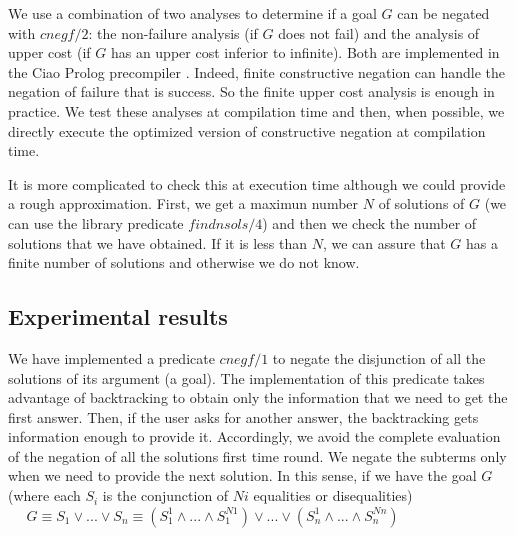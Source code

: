 \documentclass{tlp}
\begin{document}
We use a combination of two analyses to determine if a goal $G$ can be negated with $cnegf/2$: the non-failure analysis
 (if $G$ does not fail) %
and the analysis of upper cost \cite{Lopez2} (if $G$ has an upper cost inferior to infinite). Both are
implemented in the Ciao Prolog precompiler
\cite{ciaopp-iclp99-tut}. Indeed, finite constructive negation can handle the
negation of failure that is success. So the finite upper cost analysis
is enough in practice. We test these analyses at compilation time
and then, when possible, we directly execute the optimized version
of constructive negation at compilation time.


It is more complicated to check this at execution time although we
could provide a rough approximation. First, we get a maximun number
$N$ of solutions of $G$ (we can use the library predicate
$findnsols/4$) and then we check the number of solutions that we have
obtained. If it is less than $N$, we can assure that $G$ has a finite
number of solutions and otherwise we do not know.

\subsection{Experimental results}

We have implemented a predicate $cnegf/1$ to negate the disjunction of
all the solutions of its argument (a goal). The implementation of this
predicate takes advantage of backtracking to obtain only the
information that we need to get the first answer. Then, if the user
asks for another answer, the backtracking gets information enough
to provide it. Accordingly, we avoid the complete evaluation of the
negation of all the solutions first time round. We negate the subterms
only when we need to provide the next solution. In this sense, if we
have the goal $G$ (where each $S_i$ is the conjunction of $Ni$
equalities or disequalities) $~~~~~~G \equiv S_1 \vee ... \vee S_n 
 \equiv (S_1^1 \wedge...\wedge S_1^{N1}) \vee ... \vee (S_n^1
\wedge...\wedge S_n^{Nn}) $
\end{document}
